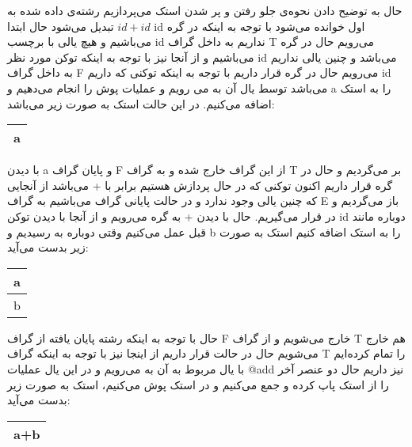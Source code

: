 حال به توضیح دادن نحوه‌ی جلو رفتن و پر شدن استک می‌پردازیم رشته‌ی داده شده به $id+id$ تبدیل می‌شود حال ابتدا id اول خوانده می‌شود با توجه به اینکه در گره  می‌باشیم و هیچ یالی با برچسب id نداریم به داخل گراف T می‌رویم حال در گره  می‌باشیم و از آنجا نیز با توجه به اینکه توکن مورد نظر id می‌باشد و چنین یالی نداریم به داخل گراف F می‌رویم حال در گره  قرار داریم با توجه به اینکه توکنی که داریم id می‌باشد توسط یال آن به  می رویم و عملیات پوش را انجام می‌دهیم و a را به استک اضافه می‌کنیم. در این حالت استک به صورت زیر می‌باشد:
\begin{latin}
	\begin{center}
		\begin{tabular}{|c|}
			\hline
			a\\
			\hline
			
		\end{tabular}
	\end{center}
\end{latin}
با دیدن a و پایان گراف F از این گراف خارج شده و به گراف T بر می‌گردیم و حال در گره  قرار داریم اکنون توکنی که در حال پردازش هستیم برابر با + می‌باشد از آنجایی که چنین یالی وجود ندارد و در حالت پایانی گراف می‌باشیم به گراف E باز می‌گردیم و در  قرار می‌گیریم. حال با دیدن + به گره  می‌رویم و از آنجا با دیدن توکن id دوباره مانند قبل عمل می‌کنیم وقتی دوباره به  رسیدیم و b را به استک اضافه کنیم استک به صورت زیر بدست می‌آید:
\begin{latin}
	\begin{center}
		\begin{tabular}{|c|}
			\hline
			a\\
			\hline
			b\\
			\hline
		\end{tabular}
	\end{center}
\end{latin}
حال با توجه به اینکه رشته پایان یافته از گراف F خارج می‌شویم و از گراف T هم خارج می‌شویم حال در حالت  قرار داریم از اینجا نیز با توجه به اینکه گراف T را تمام کرده‌ایم با یال مربوط به آن به  می‌رویم و در این یال عملیات @add نیز داریم حال دو عنصر آخر را از استک پاپ کرده و جمع می‌کنیم و در استک پوش می‌کنیم، استک به صورت زیر بدست می‌آید:
\begin{latin}
	\begin{center}
		\begin{tabular}{|c|}
			\hline
			a+b\\
			\hline
			
		\end{tabular}
	\end{center}
\end{latin}


